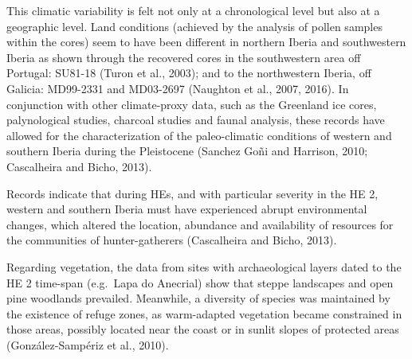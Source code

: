 \documentclass[12pt,twoside]{reedthesis}
\begin{document}
This climatic variability is felt not only at a chronological level but also at a geographic level. Land conditions (achieved by the analysis of pollen samples within the cores) seem to have been different in northern Iberia and southwestern Iberia as shown through the recovered cores in the southwestern area off Portugal: SU81-18 (Turon et al., 2003); and to the northwestern Iberia, off Galicia: MD99-2331 and MD03-2697 (Naughton et al., 2007, 2016). In conjunction with other climate-proxy data, such as the Greenland ice cores, palynological studies, charcoal studies and faunal analysis, these records have allowed for the characterization of the paleo-climatic conditions of western and southern Iberia during the Pleistocene (Sanchez Goñi and Harrison, 2010; Cascalheira and Bicho, 2013).

Records indicate that during HEs, and with particular severity in the HE 2, western and southern Iberia must have experienced abrupt environmental changes, which altered the location, abundance and availability of resources for the communities of hunter-gatherers (Cascalheira and Bicho, 2013).

Regarding vegetation, the data from sites with archaeological layers dated to the HE 2 time-span (e.g.~Lapa do Anecrial) show that steppe landscapes and open pine woodlands prevailed. Meanwhile, a diversity of species was maintained by the existence of refuge zones, as warm-adapted vegetation became constrained in those areas, possibly located near the coast or in sunlit slopes of protected areas (González-Sampériz et al., 2010).
\end{document}
